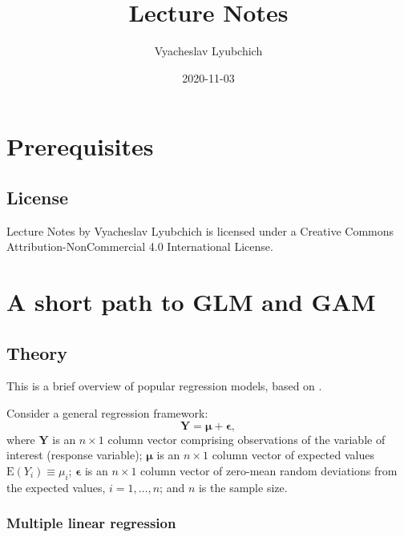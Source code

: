 \documentclass[
]{book}
\title{Lecture Notes}
\author{Vyacheslav Lyubchich}
\date{2020-11-03}
\begin{document}
\maketitle

{
\setcounter{tocdepth}{1}
\tableofcontents
}
\hypertarget{prerequisites}{%
\chapter*{Prerequisites}\label{prerequisites}}

\hypertarget{license}{%
\section*{License}\label{license}}

{Lecture Notes} by Vyacheslav Lyubchich is licensed under a Creative Commons Attribution-NonCommercial 4.0 International License.

\hypertarget{GLM}{%
\chapter{A short path to GLM and GAM}\label{GLM}}

\hypertarget{theory}{%
\section{Theory}\label{theory}}

This is a brief overview of popular regression models, based on \citet{Lyubchich:etal:2019:wires}.

Consider a general regression framework:
\begin{equation}
    \label{eq:general}
    \mathbf{Y} = \boldsymbol{\mu} + \boldsymbol{\epsilon},
\end{equation}
where \(\mathbf{Y}\) is an \(n\times1\) column vector comprising observations of the variable of interest (response variable); \(\boldsymbol{\mu}\) is an \(n\times1\) column vector of expected values \(\mathrm{E}(Y_i) \equiv \mu_i\); \(\boldsymbol{\epsilon}\) is an \(n\times1\) column vector of zero-mean random deviations from the expected values, \(i = 1,\ldots,n\); and \(n\) is the sample size.

\hypertarget{multiple-linear-regression}{%
\subsection{Multiple linear regression}\label{multiple-linear-regression}}
\end{document}

